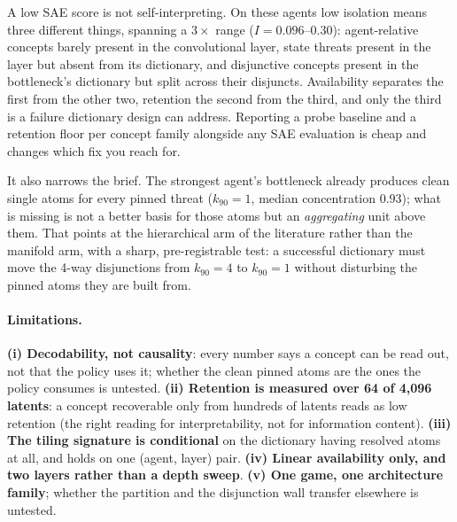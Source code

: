 \documentclass{article}
\begin{document}
A low SAE score is not self-interpreting. On these agents low isolation means
three different things, spanning a $3\times$ range ($I = 0.096$--$0.30$):
agent-relative concepts barely present in the convolutional layer, state
threats present in the layer but absent from its dictionary, and disjunctive
concepts present in the bottleneck's dictionary but split across their
disjuncts. Availability separates the first from the other two, retention the
second from the third, and only the third is a failure dictionary design can
address.
Reporting a probe baseline and a retention floor per concept family alongside
any SAE evaluation is cheap and changes which fix you reach for.

It also narrows the brief. The strongest agent's bottleneck already produces
clean single atoms for every pinned threat ($k_{90}=1$, median concentration
$0.93$); what is missing is not a better basis for those atoms but an
\emph{aggregating} unit above them. That points at the hierarchical arm of the
literature rather than the manifold arm, with a sharp, pre-registrable test: a
successful dictionary must move the 4-way disjunctions from $k_{90}=4$ to
$k_{90}=1$ without disturbing the pinned atoms they are built from.

\paragraph{Limitations.} \textbf{(i) Decodability, not causality}: every number
says a concept can be read out, not that the policy uses it; whether the clean
pinned atoms are the ones the policy consumes is untested. \textbf{(ii)
  Retention is measured over 64 of 4{,}096 latents}: a concept recoverable only
from hundreds of latents
reads as low retention (the right reading for interpretability, not for
information content). \textbf{(iii) The tiling signature is conditional} on the
dictionary having resolved atoms at all, and holds on one (agent, layer) pair. \textbf{(iv) Linear
  availability only, and two layers rather than a depth sweep}. \textbf{(v) One game, one architecture
  family}; whether the partition and the disjunction wall transfer elsewhere is
untested.



\end{document}
